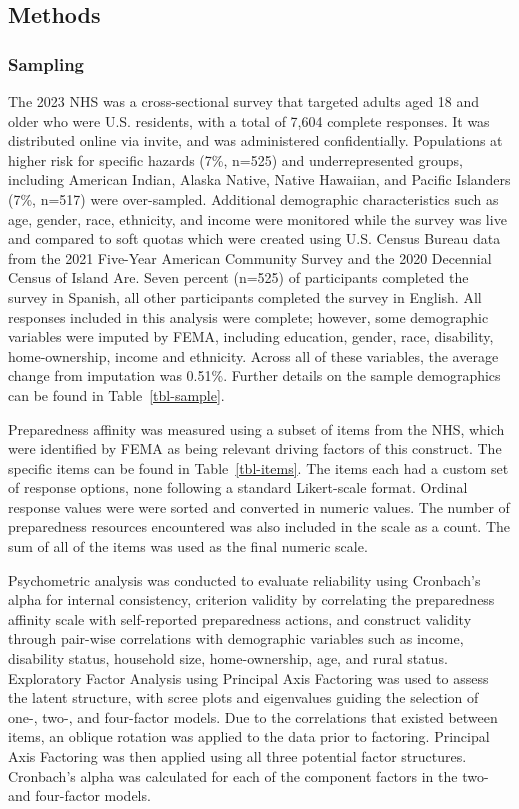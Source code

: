 \documentclass[
  letterpaper,
  DIV=11,
  numbers=noendperiod]{scrartcl}
\begin{document}
\subsection{Methods}\label{methods}

\subsubsection{Sampling}\label{sampling}

The 2023 NHS was a cross-sectional survey that targeted adults aged 18
and older who were U.S. residents, with a total of 7,604 complete
responses. It was distributed online via invite, and was administered
confidentially. Populations at higher risk for specific hazards (7\%,
n=525) and underrepresented groups, including American Indian, Alaska
Native, Native Hawaiian, and Pacific Islanders (7\%, n=517) were
over-sampled. Additional demographic characteristics such as age,
gender, race, ethnicity, and income were monitored while the survey was
live and compared to soft quotas which were created using U.S. Census
Bureau data from the 2021 Five-Year American Community Survey and the
2020 Decennial Census of Island Are. Seven percent (n=525) of
participants completed the survey in Spanish, all other participants
completed the survey in English. All responses included in this analysis
were complete; however, some demographic variables were imputed by FEMA,
including education, gender, race, disability, home-ownership, income
and ethnicity. Across all of these variables, the average change from
imputation was 0.51\%. Further details on the sample demographics can be
found in Table~\ref{tbl-sample}.

Preparedness affinity was measured using a subset of items from the NHS,
which were identified by FEMA as being relevant driving factors of this
construct. The specific items can be found in Table~\ref{tbl-items}. The
items each had a custom set of response options, none following a
standard Likert-scale format. Ordinal response values were were sorted
and converted in numeric values. The number of preparedness resources
encountered was also included in the scale as a count. The sum of all of
the items was used as the final numeric scale.

Psychometric analysis was conducted to evaluate reliability using
Cronbach's alpha for internal consistency, criterion validity by
correlating the preparedness affinity scale with self-reported
preparedness actions, and construct validity through pair-wise
correlations with demographic variables such as income, disability
status, household size, home-ownership, age, and rural status.
Exploratory Factor Analysis using Principal Axis Factoring was used to
assess the latent structure, with scree plots and eigenvalues guiding
the selection of one-, two-, and four-factor models. Due to the
correlations that existed between items, an oblique rotation was applied
to the data prior to factoring. Principal Axis Factoring was then
applied using all three potential factor structures. Cronbach's alpha
was calculated for each of the component factors in the two- and
four-factor models.
\end{document}
